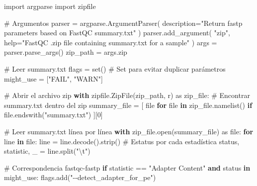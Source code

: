 \documentclass[
  letterpaper,
  DIV=11,
  numbers=noendperiod]{scrartcl}
\newenvironment{Shaded}{\begin{snugshade}}{\end{snugshade}}
\newcommand{\BuiltInTok}[1]{\textcolor[rgb]{0.00,0.23,0.31}{#1}}
\newcommand{\CharTok}[1]{\textcolor[rgb]{0.13,0.47,0.30}{#1}}
\newcommand{\CommentTok}[1]{\textcolor[rgb]{0.37,0.37,0.37}{#1}}
\newcommand{\ControlFlowTok}[1]{\textcolor[rgb]{0.00,0.23,0.31}{\textbf{#1}}}
\newcommand{\DecValTok}[1]{\textcolor[rgb]{0.68,0.00,0.00}{#1}}
\newcommand{\ImportTok}[1]{\textcolor[rgb]{0.00,0.46,0.62}{#1}}
\newcommand{\KeywordTok}[1]{\textcolor[rgb]{0.00,0.23,0.31}{\textbf{#1}}}
\newcommand{\NormalTok}[1]{\textcolor[rgb]{0.00,0.23,0.31}{#1}}
\newcommand{\OperatorTok}[1]{\textcolor[rgb]{0.37,0.37,0.37}{#1}}
\newcommand{\StringTok}[1]{\textcolor[rgb]{0.13,0.47,0.30}{#1}}
\begin{document}
\begin{Shaded}
\begin{Highlighting}[]
\ImportTok{import}\NormalTok{ argparse}
\ImportTok{import}\NormalTok{ zipfile}

\CommentTok{\# Argumentos}
\NormalTok{parser }\OperatorTok{=}\NormalTok{ argparse.ArgumentParser(}
\NormalTok{  description}\OperatorTok{=}\StringTok{"Return fastp parameters based on FastQC summary.txt"}
\NormalTok{)}
\NormalTok{parser.add\_argument(}
  \StringTok{"zip"}\NormalTok{,}
  \BuiltInTok{help}\OperatorTok{=}\StringTok{"FastQC .zip file containing summary.txt for a sample"}
\NormalTok{)}
\NormalTok{args }\OperatorTok{=}\NormalTok{ parser.parse\_args()}
\NormalTok{zip\_path }\OperatorTok{=}\NormalTok{ args.}\BuiltInTok{zip}

\CommentTok{\# Leer summary.txt}
\NormalTok{flags }\OperatorTok{=} \BuiltInTok{set}\NormalTok{() }\CommentTok{\# Set para evitar duplicar parámetros}
\NormalTok{might\_use }\OperatorTok{=}\NormalTok{ [}\StringTok{"FAIL"}\NormalTok{, }\StringTok{"WARN"}\NormalTok{]}

\CommentTok{\# Abrir el archivo zip}
\ControlFlowTok{with}\NormalTok{ zipfile.ZipFile(zip\_path, }\StringTok{\textquotesingle{}r\textquotesingle{}}\NormalTok{) }\ImportTok{as}\NormalTok{ zip\_file:}
  \CommentTok{\# Encontrar summary.txt dentro del zip}
\NormalTok{  summary\_file }\OperatorTok{=}\NormalTok{ [}
    \BuiltInTok{file} \ControlFlowTok{for} \BuiltInTok{file} \KeywordTok{in}\NormalTok{ zip\_file.namelist() }\ControlFlowTok{if} \BuiltInTok{file}\NormalTok{.endswith(}\StringTok{"summary.txt"}\NormalTok{)}
\NormalTok{    ][}\DecValTok{0}\NormalTok{]}

  \CommentTok{\# Leer summary.txt línea por línea}
  \ControlFlowTok{with}\NormalTok{ zip\_file.}\BuiltInTok{open}\NormalTok{(summary\_file) }\ImportTok{as} \BuiltInTok{file}\NormalTok{:}
    \ControlFlowTok{for}\NormalTok{ line }\KeywordTok{in} \BuiltInTok{file}\NormalTok{:}
\NormalTok{      line }\OperatorTok{=}\NormalTok{ line.decode().strip()}
      \CommentTok{\# Estatus por cada estadística}
\NormalTok{      status, statistic, \_ }\OperatorTok{=}\NormalTok{ line.split(}\StringTok{"}\CharTok{\textbackslash{}t}\StringTok{"}\NormalTok{)}

      \CommentTok{\# Correspondencia fastqc{-}fastp}
      \ControlFlowTok{if}\NormalTok{ statistic }\OperatorTok{==} \StringTok{"Adapter Content"} \KeywordTok{and}\NormalTok{ status }\KeywordTok{in}\NormalTok{ might\_use:}
\NormalTok{        flags.add(}\StringTok{"{-}{-}detect\_adapter\_for\_pe"}\NormalTok{)}


\end{Highlighting}
\end{Shaded}
\end{document}
